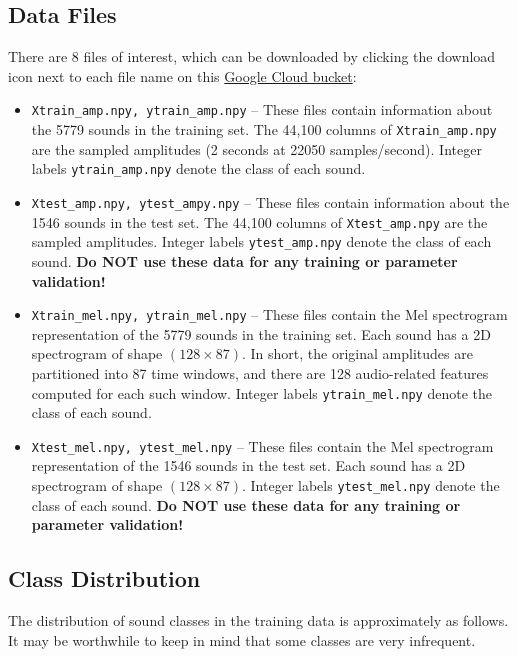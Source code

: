 \documentclass[12pt]{article}
\begin{document}
\subsection{Data Files}
There are 8 files of interest, which can be downloaded by clicking the download icon next to each file name on this \href{https://console.cloud.google.com/storage/browser/cs181_practical_data}{Google Cloud bucket}:
\begin{itemize}
\item \verb|Xtrain_amp.npy, ytrain_amp.npy| -- These files contain information about the 5779 sounds in the training set. The 44,100 columns of \verb|Xtrain_amp.npy| are the sampled amplitudes
(2 seconds at 22050 samples/second). Integer labels \verb|ytrain_amp.npy| denote the class of each sound.

\item \verb|Xtest_amp.npy, ytest_ampy.npy| -- These files contain information about the 1546 sounds in the test set. The 44,100 columns of \verb|Xtest_amp.npy| are the sampled amplitudes. Integer labels \verb|ytest_amp.npy| denote the class of each sound.  \textbf{Do NOT use these data for any training or parameter validation!}

\item \verb|Xtrain_mel.npy, ytrain_mel.npy| -- These files contain the Mel spectrogram representation of the 5779 sounds in the training set.  Each sound has a 2D spectrogram of shape $(128 \times 87)$. In short,
the original amplitudes are partitioned into 87 time windows,
and there are 128 audio-related features computed for each such window. Integer labels \verb|ytrain_mel.npy| denote the class of each sound.

\item \verb|Xtest_mel.npy, ytest_mel.npy| -- These files contain the Mel spectrogram representation of the 1546 sounds in the test set.  Each sound has a 2D spectrogram of shape $(128 \times 87)$.  Integer labels \verb|ytest_mel.npy| denote the class of each sound.  \textbf{Do NOT use these data for any training or parameter validation!}

\end{itemize}

\subsection{Class Distribution}
The distribution of sound classes in the training data is approximately as follows. It may be worthwhile to keep in mind that some classes are very infrequent.
\end{document}

